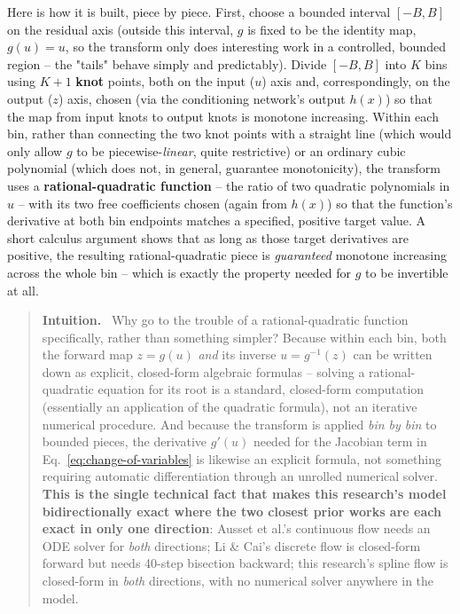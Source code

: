 \documentclass[11pt]{article}
\newenvironment{intuition}
  {\par\addvspace{8pt}\begin{quote}\noindent\textbf{\textcolor{blue!40!black}{Intuition.}}\ }
  {\end{quote}\par\addvspace{8pt}}
\begin{document}
Here is how it is built, piece by piece. First, choose a bounded interval
$[-B, B]$ on the residual axis (outside this interval, $g$ is fixed to be
the identity map, $g(u) = u$, so the transform only does interesting work
in a controlled, bounded region -- the "tails" behave simply and
predictably). Divide $[-B, B]$ into $K$ bins using $K+1$ \textbf{knot}
points, both on the input ($u$) axis and, correspondingly, on the output
($z$) axis, chosen (via the conditioning network's output $h(x)$) so that
the map from input knots to output knots is monotone increasing. Within
each bin, rather than connecting the two knot points with a straight
line (which would only allow $g$ to be piecewise-\emph{linear}, quite
restrictive) or an ordinary cubic polynomial (which does not, in
general, guarantee monotonicity), the transform uses a
\textbf{rational-quadratic function} -- the ratio of two quadratic
polynomials in $u$ -- with its two free coefficients chosen (again from
$h(x)$) so that the function's derivative at both bin endpoints matches a
specified, positive target value. A short calculus argument
\citep{durkan2019nsf} shows that as long as those target derivatives are
positive, the resulting rational-quadratic piece is \emph{guaranteed}
monotone increasing across the whole bin -- which is exactly the property
needed for $g$ to be invertible at all.

\begin{intuition}
Why go to the trouble of a rational-quadratic function specifically,
rather than something simpler? Because within each bin, both the forward
map $z = g(u)$ \emph{and} its inverse $u = g^{-1}(z)$ can be written down
as explicit, closed-form algebraic formulas -- solving a
rational-quadratic equation for its root is a standard, closed-form
computation (essentially an application of the quadratic formula), not
an iterative numerical procedure. And because the transform is applied
\emph{bin by bin} to bounded pieces, the derivative $g'(u)$ needed for
the Jacobian term in Eq.~\eqref{eq:change-of-variables} is likewise an
explicit formula, not something requiring automatic differentiation
through an unrolled numerical solver. \textbf{This is the single
technical fact that makes this research's model bidirectionally
exact where the two closest prior works are each exact in only one
direction}: Ausset et al.'s continuous flow needs an ODE solver for
\emph{both} directions; Li \& Cai's discrete flow is closed-form forward
but needs 40-step bisection backward; this research's spline flow is
closed-form in \emph{both} directions, with no numerical solver anywhere
in the model.
\end{intuition}
\end{document}
